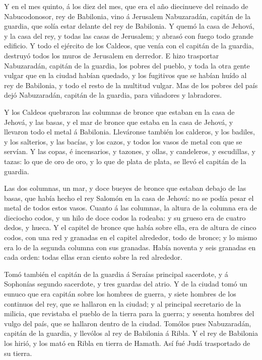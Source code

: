  Y en el mes quinto, á los diez del mes, que era el año
diecinueve del reinado de Nabucodonosor, rey de Babilonia, vino á
Jerusalem Nabuzaradán, capitán de la guardia, que solía estar delante
del rey de Babilonia.  Y quemó la casa de Jehová, y la casa
del rey, y todas las casas de Jerusalem; y abrasó con fuego todo grande
edificio.  Y todo el ejército de los Caldeos, que venía con
el capitán de la guardia, destruyó todos los muros de Jerusalem en
derredor.  E hizo trasportar Nabuzaradán, capitán de la
guardia, los pobres del pueblo, y toda la otra gente vulgar que en la
ciudad habían quedado, y los fugitivos que se habían huído al rey de
Babilonia, y todo el resto de la multitud vulgar.  Mas de
los pobres del país dejó Nabuzaradán, capitán de la guardia, para
viñadores y labradores.

 Y los Caldeos quebraron las columnas de bronce que estaban
en la casa de Jehová, y las basas, y el mar de bronce que estaba en la
casa de Jehová, y llevaron todo el metal á Babilonia. 
Lleváronse también los calderos, y los badiles, y los salterios, y las
bacías, y los cazos, y todos los vasos de metal con que se servían.
 Y las copas, é incensarios, y tazones, y ollas, y
candeleros, y escudillas, y tazas: lo que de oro de oro, y lo que de
plata de plata, se llevó el capitán de la guardia.

 Las dos columnas, un mar, y doce bueyes de bronce que
estaban debajo de las basas, que había hecho el rey Salomón en la casa
de Jehová: no se podía pesar el metal de todos estos vasos.
 Cuanto á las columnas, la altura de la columna era de
dieciocho codos, y un hilo de doce codos la rodeaba: y su grueso era de
cuatro dedos, y hueca.  Y el capitel de bronce que había
sobre ella, era de altura de cinco codos, con una red y granadas en el
capitel alrededor, todo de bronce; y lo mismo era lo de la segunda
columna con sus granadas.  Había noventa y seis granadas en
cada orden: todas ellas eran ciento sobre la red alrededor.

 Tomó también el capitán de la guardia á Seraías principal
sacerdote, y á Sophonías segundo sacerdote, y tres guardas del atrio.
 Y de la ciudad tomó un eunuco que era capitán sobre los
hombres de guerra, y siete hombres de los continuos del rey, que se
hallaron en la ciudad; y al principal secretario de la milicia, que
revistaba el pueblo de la tierra para la guerra; y sesenta hombres del
vulgo del país, que se hallaron dentro de la ciudad. 
Tomólos pues Nabuzaradán, capitán de la guardia, y llevólos al rey de
Babilonia á Ribla.  Y el rey de Babilonia los hirió, y los
mató en Ribla en tierra de Hamath. Así fué Judá trasportado de su
tierra.

